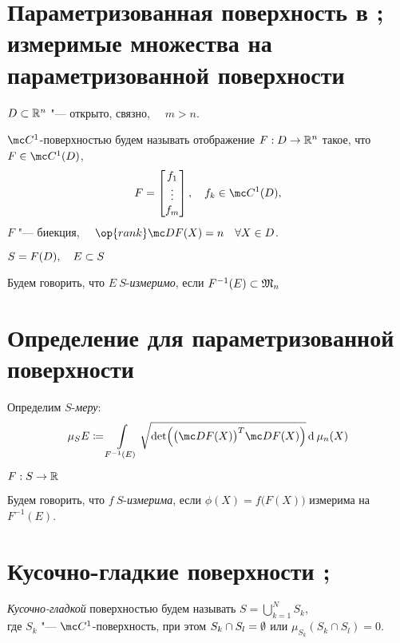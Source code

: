 \section{Параметризованная поверхность в ; измеримые множества на параметризованной поверхности}

\begin{definition}
	$ D \subset \mathbb{R}^n $ "--- открыто, связно, $ \quad m > n $.

	$ \mc C^1 $-поверхностью будем называть отображение $ F : D \to \mathbb{R}^n $ такое, что $ F \in \mc C^1(D) $, \ie
	$$ F = \column{f_1}{f_m}, \quad f_k \in \mc C^1(D), $$
	$ F $ "--- биекция, $ \quad \op{rank} \mc DF(X) = n \quad \forall X \in D $.
\end{definition}

\begin{definition}
	$ S = F(D), \quad E \subset S $

	Будем говорить, что $ E ~ S $-\emph{измеримо}, если $ F^{-1}(E) \subset \mathfrak M_n $
\end{definition}

\section{Определение  для параметризованной поверхности }

\begin{definition}
	Определим $ S $-\emph{меру}:
	$$ \mu_S E \coloneq \int\limits_{F^{-1}(E)} \sqrt{\det \Bigl( \bigl( \mc DF(X) \bigr)^T \mc DF(X) \Bigr)} \di \mu_n(X) $$
\end{definition}

\begin{definition}
	$ F : S \to \mathbb{R} $

	Будем говорить, что $ f ~ S $-\emph{измерима}, если $ \phi(X) = f \bigl( F(X) \bigr) $ измерима на $ F^{-1}(E) $.
\end{definition}

\section{Кусочно-гладкие поверхности ; }

\begin{definition}
	\emph{Кусочно-гладкой} поверхностью будем называть $ S = \bigcup_{k = 1}^N S_k $, \\
	где $ S_k $ "--- $ \mc C^1 $-поверхность, при этом $ S_k \cap S_l = \emptyset $ или $ \mu_{S_k}(S_k \cap S_l) = 0 $.
\end{definition}

